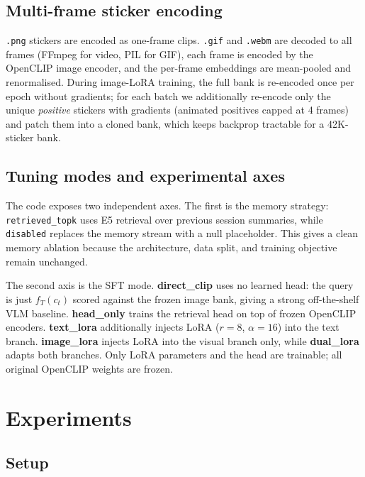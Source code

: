 \documentclass[10pt,twocolumn,letterpaper]{article}
\begin{document}
\subsection{Multi-frame sticker encoding}

\texttt{.png} stickers are encoded as one-frame clips. \texttt{.gif} and
\texttt{.webm} are decoded to all frames (FFmpeg for video, PIL for GIF),
each frame is encoded by the OpenCLIP image encoder, and the per-frame
embeddings are mean-pooled and renormalised. During image-LoRA training,
the full bank is re-encoded once per epoch without gradients; for each batch
we additionally re-encode only the unique \emph{positive} stickers with
gradients (animated positives capped at 4 frames) and patch them into a
cloned bank, which keeps backprop tractable for a 42K-sticker bank.

\subsection{Tuning modes and experimental axes}

The code exposes two independent axes. The first is the memory strategy:
\texttt{retrieved\_topk} uses E5 retrieval over previous session summaries,
while \texttt{disabled} replaces the memory stream with a null placeholder.
This gives a clean memory ablation because the architecture, data split, and
training objective remain unchanged.

The second axis is the SFT mode. \textbf{direct\_clip} uses no learned head:
the query is just $f_T(c_t)$ scored against the frozen image bank, giving a
strong off-the-shelf VLM baseline. \textbf{head\_only} trains the retrieval
head on top of frozen OpenCLIP encoders. \textbf{text\_lora} additionally
injects LoRA ($r{=}8$, $\alpha{=}16$) into the text branch.
\textbf{image\_lora} injects LoRA into the visual branch only, while
\textbf{dual\_lora} adapts both branches. Only LoRA parameters and the head
are trainable; all original OpenCLIP weights are frozen.

\section{Experiments}

\subsection{Setup}
\end{document}

